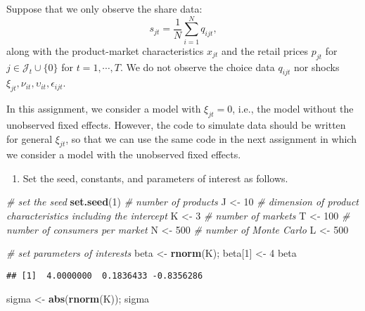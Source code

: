 \documentclass[
]{book}
\newenvironment{Shaded}{\begin{snugshade}}{\end{snugshade}}
\newcommand{\CommentTok}[1]{\textcolor[rgb]{0.56,0.35,0.01}{\textit{#1}}}
\newcommand{\DecValTok}[1]{\textcolor[rgb]{0.00,0.00,0.81}{#1}}
\newcommand{\KeywordTok}[1]{\textcolor[rgb]{0.13,0.29,0.53}{\textbf{#1}}}
\newcommand{\NormalTok}[1]{#1}
\newcommand{\StringTok}[1]{\textcolor[rgb]{0.31,0.60,0.02}{#1}}
\providecommand{\tightlist}{%
  \setlength{\itemsep}{0pt}\setlength{\parskip}{0pt}}
\begin{document}
Suppose that we only observe the share data:
\[
s_{jt} = \frac{1}{N} \sum_{i = 1}^N q_{ijt},
\]
along with the product-market characteristics \(x_{jt}\) and the retail prices \(p_{jt}\) for \(j \in \mathcal{J}_t \cup \{0\}\) for \(t = 1, \cdots, T\). We do not observe the choice data \(q_{ijt}\) nor shocks \(\xi_{jt}, \nu_{it}, \upsilon_{it}, \epsilon_{ijt}\).

In this assignment, we consider a model with \(\xi_{jt} = 0\), i.e., the model without the unobserved fixed effects. However, the code to simulate data should be written for general \(\xi_{jt}\), so that we can use the same code in the next assignment in which we consider a model with the unobserved fixed effects.

\begin{enumerate}
\def\labelenumi{\arabic{enumi}.}
\tightlist
\item
  Set the seed, constants, and parameters of interest as follows.
\end{enumerate}

\begin{Shaded}
\begin{Highlighting}[]
\CommentTok{# set the seed}
\KeywordTok{set.seed}\NormalTok{(}\DecValTok{1}\NormalTok{)}
\CommentTok{# number of products}
\NormalTok{J <-}\StringTok{ }\DecValTok{10}
\CommentTok{# dimension of product characteristics including the intercept}
\NormalTok{K <-}\StringTok{ }\DecValTok{3}
\CommentTok{# number of markets}
\NormalTok{T <-}\StringTok{ }\DecValTok{100}
\CommentTok{# number of consumers per market}
\NormalTok{N <-}\StringTok{ }\DecValTok{500}
\CommentTok{# number of Monte Carlo}
\NormalTok{L <-}\StringTok{ }\DecValTok{500}
\end{Highlighting}
\end{Shaded}

\begin{Shaded}
\begin{Highlighting}[]
\CommentTok{# set parameters of interests}
\NormalTok{beta <-}\StringTok{ }\KeywordTok{rnorm}\NormalTok{(K); }
\NormalTok{beta[}\DecValTok{1}\NormalTok{] <-}\StringTok{ }\DecValTok{4}
\NormalTok{beta}
\end{Highlighting}
\end{Shaded}

\begin{verbatim}
## [1]  4.0000000  0.1836433 -0.8356286
\end{verbatim}

\begin{Shaded}
\begin{Highlighting}[]
\NormalTok{sigma <-}\StringTok{ }\KeywordTok{abs}\NormalTok{(}\KeywordTok{rnorm}\NormalTok{(K)); sigma}
\end{Highlighting}
\end{Shaded}
\end{document}
